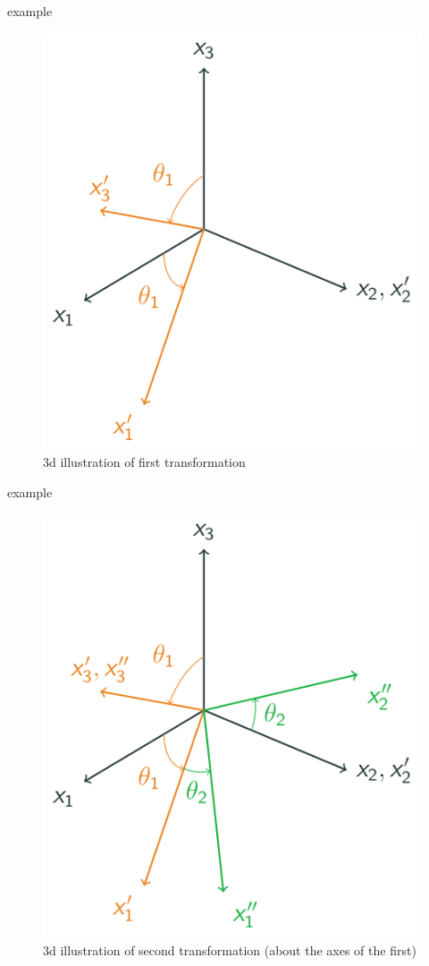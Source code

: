 \documentclass[12pt,handout]{beamer}
\let\Oldincludegraphics\includegraphics
\renewcommand{\includegraphics}[2][]{\Oldincludegraphics[width=\textwidth,height=0.7\textheight,keepaspectratio]{#2}}
\begin{document}
\begin{frame}{example}
\protect\hypertarget{example-1}{}
\begin{figure}
\centering
\includegraphics{../images/transform3d-2.svg}
\caption{3d illustration of first transformation}
\end{figure}
\end{frame}

\begin{frame}{example}
\protect\hypertarget{example-2}{}
\begin{figure}
\centering
\includegraphics{../images/transform3d-3.svg}
\caption{3d illustration of second transformation (about the axes of the
first)}
\end{figure}
\end{frame}
\end{document}
